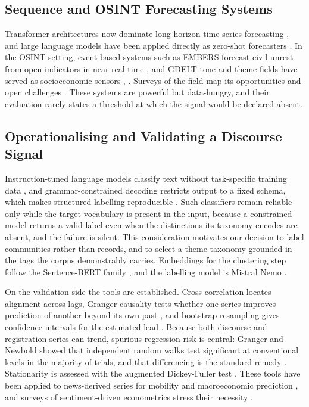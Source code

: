 \documentclass[conference]{IEEEtran}
\begin{document}
\subsection{Sequence and OSINT Forecasting Systems}
Transformer architectures now dominate long-horizon time-series forecasting
\cite{informer2021}, and large language models have been applied directly as
zero-shot forecasters \cite{gruver2023}. In the OSINT setting, event-based systems such as
EMBERS forecast civil unrest from open indicators in near real time
\cite{embers2014}, and GDELT tone and theme fields have served as socioeconomic
sensors \cite{gdelt2013}, \cite{bollen2011}. Surveys of the field map its
opportunities and open challenges \cite{osint2020}. These systems are powerful
but data-hungry, and their evaluation rarely states a threshold at which the
signal would be declared absent.

\subsection{Operationalising and Validating a Discourse Signal}
Instruction-tuned language models classify text without task-specific training
data \cite{brown2020}, and grammar-constrained decoding restricts output to a
fixed schema, which makes structured labelling reproducible \cite{willard2023}.
Such classifiers remain reliable only while the target vocabulary is present in
the input, because a constrained model returns a valid label even when the
distinctions its taxonomy encodes are absent, and the failure is silent. This
consideration motivates our decision to label communities rather than records,
and to select a theme taxonomy grounded in the tags the corpus demonstrably
carries. Embeddings for the clustering step follow the Sentence-BERT family
\cite{reimers2019}, and the labelling model is Mistral Nemo \cite{mistralnemo}.

On the validation side the tools are established. Cross-correlation locates
alignment across lags, Granger causality tests whether one series improves
prediction of another beyond its own past \cite{granger1969}, and bootstrap
resampling gives confidence intervals for the estimated lead \cite{efron1993}.
Because both discourse and registration series can trend, spurious-regression
risk is central: Granger and Newbold showed that independent random walks test
significant at conventional levels in the majority of trials, and that
differencing is the standard remedy \cite{grangernewbold1974}. Stationarity is
assessed with the augmented Dickey-Fuller test \cite{dickeyfuller1979}. These
tools have been applied to news-derived series for mobility and macroeconomic
prediction \cite{mobility2021}, and surveys of sentiment-driven econometrics
stress their necessity \cite{algaba2020}.
\end{document}
